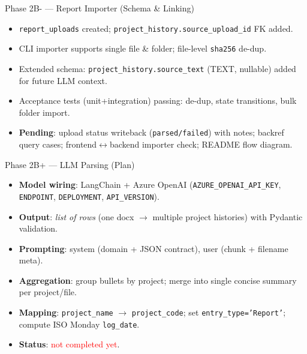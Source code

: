 \documentclass [aspectratio=169]{beamer}
\begin{document}
\begin{frame}{Phase 2B- — Report Importer (Schema \& Linking)}
\begin{itemize}
    \item \texttt{report\_uploads} created; \texttt{project\_history.source\_upload\_id} FK added.
    \item CLI importer supports single file \& folder; file-level \texttt{sha256} de-dup.
    \item Extended schema: \texttt{project\_history.source\_text} (TEXT, nullable) added for future LLM context.
    \item Acceptance tests (unit+integration) passing: de-dup, state transitions, bulk folder import.
    \item \textbf{Pending}: upload status writeback (\texttt{parsed/failed}) with notes; backref query cases; frontend$\leftrightarrow$backend importer check; README flow diagram.
\end{itemize}
\end{frame}

\begin{frame}{Phase 2B+ — LLM Parsing (Plan)}
\begin{itemize}
    \item \textbf{Model wiring}: LangChain + Azure OpenAI (\texttt{AZURE\_OPENAI\_API\_KEY}, \texttt{ENDPOINT}, \texttt{DEPLOYMENT}, \texttt{API\_VERSION}).
    \item \textbf{Output}: \textit{list of rows} (one docx $\rightarrow$ multiple project histories) with Pydantic validation.
    \item \textbf{Prompting}: system (domain + JSON contract), user (chunk + filename meta).
    \item \textbf{Aggregation}: group bullets by project; merge into single concise summary per project/file.
    \item \textbf{Mapping}: \texttt{project\_name} $\rightarrow$ \texttt{project\_code}; set \texttt{entry\_type='Report'}; compute ISO Monday \texttt{log\_date}.
    \item \textbf{Status}: \textcolor{red}{not completed yet}.
\end{itemize}
\end{frame}
\end{document}
